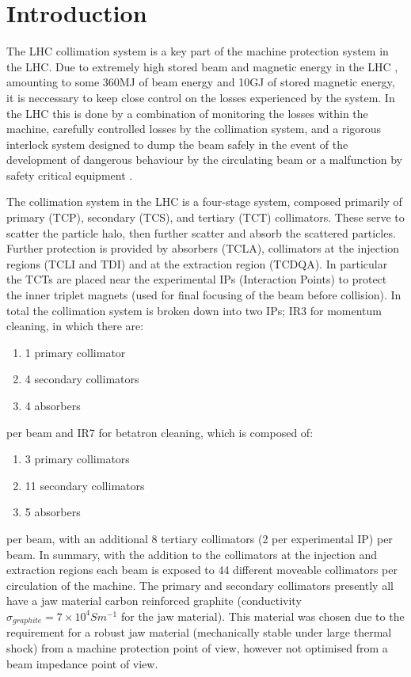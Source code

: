 \section{Introduction}

The LHC collimation system is a key part of the machine protection system in the LHC. Due to extremely high stored beam and magnetic energy in the LHC \cite{Schmidt:LHCMP}, amounting to some 360MJ of beam energy and 10GJ of stored magnetic energy, it is neccessary to keep close control on the losses experienced by the system. In the LHC this is done by a combination of monitoring the losses within the machine, carefully controlled losses by the collimation system, and a rigorous interlock system designed to dump the beam safely in the event of the development of dangerous behaviour by the circulating beam or a malfunction by safety critical equipment \cite{Schmidt:LHCMP}.

The collimation system in the LHC is a four-stage system, composed primarily of primary (TCP), secondary (TCS), and tertiary (TCT) collimators. These serve to scatter the particle halo, then further scatter and absorb the scattered particles. Further protection is provided by absorbers (TCLA), collimators at the injection regions (TCLI and TDI) and at the extraction region (TCDQA). In particular the TCTs are placed near the experimental IPs (Interaction Points) to protect the inner triplet magnets (used for final focusing of the beam before collision). In total the collimation system is broken down into two IPs; IR3 for momentum cleaning, in which there are:

\begin{enumerate}
\item{1 primary collimator}
\item{4 secondary collimators}
\item{4 absorbers}
\end{enumerate}

per beam and IR7 for betatron cleaning, which is composed of:

\begin{enumerate}
\item{3 primary collimators}
\item{11 secondary collimators}
\item{5 absorbers}
\end{enumerate}

per beam, with an additional 8 tertiary collimators (2 per experimental IP) per beam. In summary, with the addition to the collimators at the injection and extraction regions each beam is exposed to 44 different moveable collimators per circulation of the machine. The primary and secondary collimators presently all have a jaw material carbon reinforced graphite (conductivity $\sigma_{graphite} = 7 \times 10^{4} S m^{-1} $ for the jaw material). This material was chosen due to the requirement for a robust jaw material (mechanically stable under large thermal shock) from a machine protection point of view, however not optimised from a beam impedance point of view.

